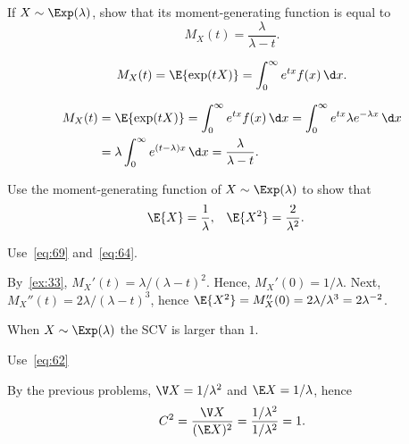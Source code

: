 \begin{extra}
 If $X\sim\Exp(\lambda)$, show that its moment-generating function is equal to
 \begin{equation*}
 M_X(t) = \frac{\lambda}{\lambda-t}.
 \end{equation*}
\begin{hint}
 \begin{equation*}
 M_X(t) = \E{\exp(t X)} =\int_0^\infty e^{t x} f(x) \,\d x.
\end{equation*}
\end{hint}
\begin{solution}
 \begin{align*}
 M_X(t) &= \E{\exp(t X)} 
=\int_0^\infty e^{tx} f(x) \,\d x 
=\int_0^\infty e^{tx} \lambda e^{-\lambda x} \,\d x \\
&=\lambda \int_0^\infty e^{(t-\lambda)x} \,\d x 
=\frac{\lambda}{\lambda -t}.
 \end{align*}
\end{solution}
 \end{extra}

\begin{exercise}
Use the moment-generating function of $X\sim\Exp(\lambda)$ to show that
 \begin{align*}
 \E{X} &=\frac1\lambda, & 
 \E{X^2} &=\frac2{\lambda^2}.
 \end{align*}
\begin{hint}
Use~\cref{eq:69} and~\cref{eq:64}.
\end{hint}
\begin{solution} By~\cref{ex:33}, 
 $ M_X'(t)=\lambda/(\lambda-t)^2$. Hence, $M_X'(0)=1/\lambda$. Next, $M_X''(t)=2\lambda/(\lambda-t)^3$, hence $\E{X^2}=M_X''(0)=2\lambda/\lambda^3=2\lambda^{-2}$. 
\end{solution}
 \end{exercise}

\begin{extra}
When $X\sim\Exp(\lambda)$ the SCV is larger than $1$.
\begin{hint}
 Use~\cref{eq:62} 
\end{hint}
\begin{solution}
 By the previous problems, $\V X = 1/\lambda^2$ and $\E X=1/\lambda$, hence
 \begin{equation*}
 C^2= \frac{\V X}{(\E X)^2} = \frac{1/\lambda^2}{1/\lambda^2} = 1.
 \end{equation*}
\end{solution}
\end{extra}

